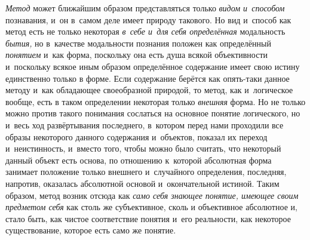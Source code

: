 {\em Метод} может ближайшим
образом представляться только {\em видом
и~способом} познавания, и~он в~самом деле имеет природу
такового. Но вид и~способ как метод есть не только некоторая
{\em в~себе и~для себя определённая}
модальность {\em бытия,}
но в~качестве модальности познания положен как определённый
{\em понятием} и~как
форма, поскольку она есть душа всякой объективности и~поскольку всякое иным
образом определённое содержание имеет свою истину единственно только в
форме. Если содержание берётся как опять-таки данное методу и~как
обладающее своеобразной природой, то метод, как и~логическое вообще, есть в
таком определении некоторая только
{\em внешняя} форма. Но
не только можно против такого понимания сослаться на основное понятие
логического, но и~весь ход развёртывания последнего, в~котором перед нами
проходили все образы некоторого данного содержания и~объектов, показал их
переход и~неистинность, и~вместо того, чтобы можно было считать, что
некоторый данный объект есть основа, по отношению к~которой абсолютная
форма занимает положение только внешнего и~случайного определения,
последняя, напротив, оказалась абсолютной основой и~окончательной истиной.
Таким образом, метод возник отсюда как
{\em само себя знающее понятие, имеющее
своим предметом себя} как столь же субъективное, сколь и
объективное абсолютное и, стало быть, как чистое соответствие понятия и~его
реальности, как некоторое существование, которое есть само же понятие.

